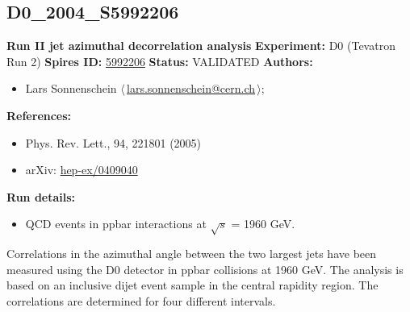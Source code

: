 \subsection[D0\_2004\_S5992206]{D0\_2004\_S5992206\,\cite{Abazov:2004hm}}
\textbf{Run II jet azimuthal decorrelation analysis}\newline
\textbf{Experiment:} D0 (Tevatron Run 2) \newline
\textbf{Spires ID:} \href{http://www.slac.stanford.edu/spires/find/hep/www?rawcmd=key+5992206}{5992206}\newline
\textbf{Status:} VALIDATED\newline
\textbf{Authors:}
\begin{itemize}
  \item Lars Sonnenschein $\langle\,$\href{mailto:lars.sonnenschein@cern.ch}{lars.sonnenschein@cern.ch}$\,\rangle$;
\end{itemize}
\textbf{References:}
\begin{itemize}
  \item Phys. Rev. Lett., 94, 221801 (2005)
  \item arXiv: \href{http://arxiv.org/abs/hep-ex/0409040}{hep-ex/0409040}
\end{itemize}
\textbf{Run details:}
\begin{itemize}

  \item QCD events in ppbar interactions at \ensuremath{\sqrt{s}} = 1960 GeV.\end{itemize}

\noindent Correlations in the azimuthal angle between the two largest \pT jets have been measured using the D0 detector in ppbar collisions at 1960 GeV. The analysis is based on an inclusive dijet event sample in the central rapidity region. The correlations are determined for four different \pT intervals.

\clearpage


\clearpage

